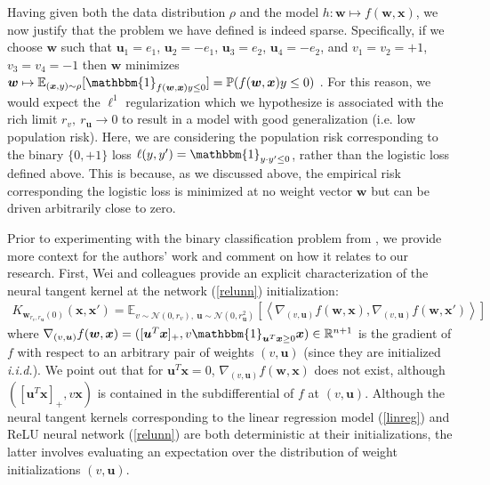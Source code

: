 \documentclass{article}
\begin{document}
Having given both the data distribution $\rho$ and the model $h: \boldsymbol{w} \mapsto f(\boldsymbol{w}, \boldsymbol{x})$, we now justify that the problem we have defined is indeed sparse. Specifically, if we choose $\boldsymbol{w}$ such that $\boldsymbol{u}_1 = e_1$, $\boldsymbol{u}_2 = -e_1$, $\boldsymbol{u}_3 = e_2$, $\boldsymbol{u}_4 = -e_2$, and $v_1 = v_2 = +1$, $v_3 = v_4 = -1$ then $\boldsymbol{w}$ minimizes $\boldsymbol{w} \mapsto \mathbb{E}_{(\boldsymbol{x}, y) \sim \rho} [\mathbbm{1}_{f(\boldsymbol{w}, \boldsymbol{x})y \leq 0}] = \mathbb{P}(f(\boldsymbol{w}, \boldsymbol{x})y \leq 0)$ \cite{wei2019regularization}. For this reason, we would expect the $\ell^1$ regularization which we hypothesize is associated with the rich limit $r_v, \ r_{\boldsymbol{u}} \rightarrow 0$ to result in a model with good generalization (i.e. low population risk). Here, we are considering the population risk corresponding to the binary $\{0, +1\}$ loss $\ell(y, y') = \mathbbm{1}_{y \cdot y' \leq 0}$, rather than the logistic loss defined above. This is because, as we discussed above, the empirical risk corresponding the logistic loss is minimized at no weight vector $\boldsymbol{w}$ but can be driven arbitrarily close to zero.

Prior to experimenting with the binary classification problem from \cite{wei2019regularization}, we provide more context for the authors' work and comment on how it relates to our research. First, Wei and colleagues provide an explicit characterization of the neural tangent kernel at the network (\ref{relunn}) initialization:
\begin{align*}
    K_{\boldsymbol{w}_{r_v, r_{\boldsymbol{u}}}(0)}(\boldsymbol{x}, \boldsymbol{x}') = \mathbb{E}_{v \sim \mathcal{N}(0, r_v), \ \boldsymbol{u} \sim \mathcal{N}(0, r_{\boldsymbol{u}}^2)}[ \left\langle \nabla_{(v, \boldsymbol{u})}f(\boldsymbol{w}, \boldsymbol{x}), \nabla_{(v, \boldsymbol{u})}f(\boldsymbol{w}, \boldsymbol{x}') \right\rangle]
\end{align*}
where $\nabla_{(v, \boldsymbol{u})}f(\boldsymbol{w}, \boldsymbol{x}) = ([\boldsymbol{u}^T\boldsymbol{x}]_+, v\mathbbm{1}_{\boldsymbol{u}^T\boldsymbol{x} \geq 0}\boldsymbol{x}) \in \mathbb{R}^{n + 1}$ is the gradient of $f$ with respect to an arbitrary pair of weights $(v, \boldsymbol{u})$ (since they are initialized \textit{i.i.d.}). We point out that for $\boldsymbol{u}^T\boldsymbol{x}=0$, $\nabla_{(v, \boldsymbol{u})}f(\boldsymbol{w}, \boldsymbol{x})$ does not exist, although $([\boldsymbol{u}^T\boldsymbol{x}]_+, v\boldsymbol{x})$ is contained in the subdifferential of $f$ at $(v, \boldsymbol{u})$. Although the neural tangent kernels corresponding to the linear regression model (\ref{linreg}) and ReLU neural network (\ref{relunn}) are both deterministic at their initializations, the latter involves evaluating an expectation over the distribution of weight initializations $(v, \boldsymbol{u})$.
\end{document}
